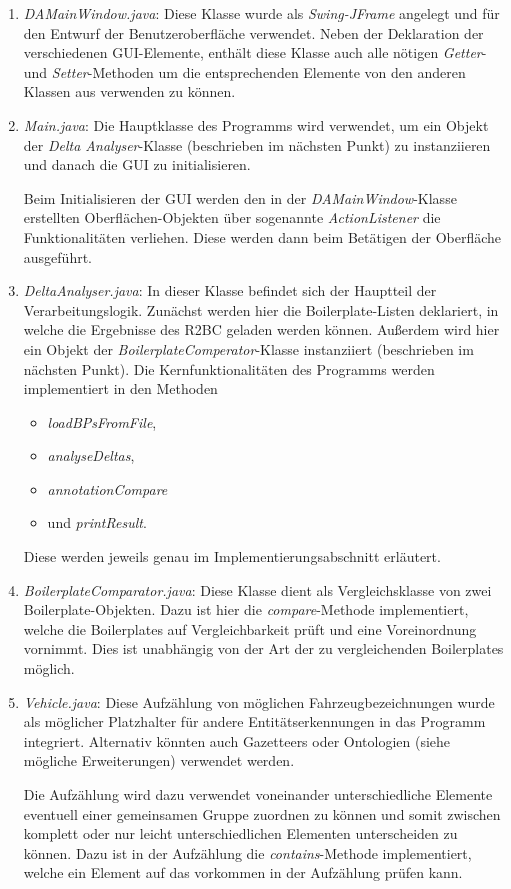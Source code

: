\documentclass[12pt]{report}
\begin{document}
\begin{enumerate}
\item \textit{DAMainWindow.java}: Diese Klasse wurde als \textit{Swing-JFrame} angelegt und für den Entwurf der Benutzeroberfläche verwendet. Neben der Deklaration der verschiedenen GUI-Elemente, enthält diese Klasse auch alle nötigen \textit{Getter}- und \textit{Setter}-Methoden um die entsprechenden Elemente von den anderen Klassen aus verwenden zu können.
\item \textit{Main.java}: Die Hauptklasse des Programms wird verwendet, um ein Objekt der \textit{Delta Analyser}-Klasse (beschrieben im nächsten Punkt) zu instanziieren und danach die GUI zu initialisieren.

Beim Initialisieren der GUI werden den in der \textit{DAMainWindow}-Klasse erstellten Oberflächen-Objekten über sogenannte \textit{ActionListener} die Funktionalitäten verliehen. Diese werden dann beim Betätigen der Oberfläche ausgeführt.
\item \textit{DeltaAnalyser.java}: In dieser Klasse befindet sich der Hauptteil der Verarbeitungslogik. Zunächst werden hier die Boilerplate-Listen deklariert, in welche die Ergebnisse des R2BC geladen werden können. Außerdem wird hier ein Objekt der \textit{BoilerplateComperator}-Klasse instanziiert (beschrieben im nächsten Punkt). 
Die Kernfunktionalitäten des Programms werden implementiert in den Methoden 
\begin{itemize}
\item \textit{loadBPsFromFile},
\item \textit{analyseDeltas},
\item \textit{annotationCompare}
\item und \textit{printResult}.
\end{itemize}
Diese werden jeweils genau im Implementierungsabschnitt erläutert. 
\item \textit{BoilerplateComparator.java}: Diese Klasse dient als Vergleichsklasse von zwei Boilerplate-Objekten. Dazu ist hier die \textit{compare}-Methode implementiert, welche die Boilerplates auf Vergleichbarkeit prüft und eine Voreinordnung vornimmt. Dies ist unabhängig von der Art der  zu vergleichenden Boilerplates möglich. 
\item \textit{Vehicle.java}: Diese Aufzählung von möglichen Fahrzeugbezeichnungen wurde als möglicher Platzhalter für andere Entitätserkennungen in das Programm integriert. Alternativ könnten auch Gazetteers oder Ontologien (siehe mögliche Erweiterungen) verwendet werden. 

Die Aufzählung wird dazu verwendet voneinander unterschiedliche Elemente eventuell einer gemeinsamen Gruppe zuordnen zu können und somit zwischen komplett oder nur leicht unterschiedlichen Elementen unterscheiden zu können. 
Dazu ist in der Aufzählung die \textit{contains}-Methode implementiert, welche ein Element auf das vorkommen in der Aufzählung prüfen kann.
\end{enumerate}
\end{document}
